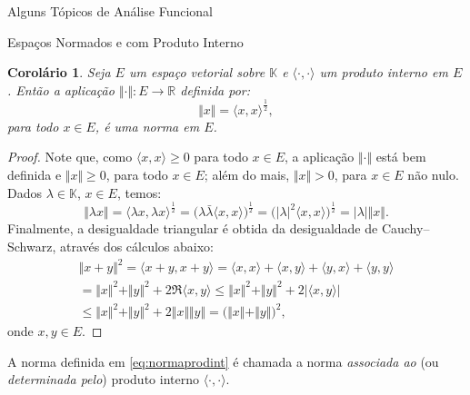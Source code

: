 \documentclass[oneside,final,11pt]{amsbook}
\newcommand{\R}{\mathds R}
\newcommand{\K}{\mathds K}
\theoremstyle{remark}\newtheorem{exercise}{Exercício}[chapter]
\theoremstyle{remark}\newtheorem{*exercise}[exercise]{\hbox to 0pt{\hskip 0pt minus 1fil*}Exercício}
\theoremstyle{definition}\newtheorem{exdefin}{Definição}[chapter]
\theoremstyle{plain}\newtheorem{teo}{Teorema}[section]
\theoremstyle{plain}\newtheorem{lem}[teo]{Lema}
\theoremstyle{plain}\newtheorem{prop}[teo]{Proposição}
\theoremstyle{plain}\newtheorem{cor}[teo]{Corolário}
\theoremstyle{definition}\newtheorem{defin}[teo]{Definição}
\theoremstyle{remark}\newtheorem{rem}[teo]{Observação}
\theoremstyle{definition}\newtheorem{notation}[teo]{Notação}
\theoremstyle{definition}\newtheorem{convention}[teo]{Convenção}
\theoremstyle{definition}\newtheorem{example}[teo]{Exemplo}
\numberwithin{section}{chapter}
\numberwithin{equation}{section}
\begin{document}
\begin{chapter}{Alguns Tópicos de Análise Funcional}
\begin{section}{Espaços Normados e com Produto Interno}
\begin{cor}
Seja $E$ um espaço vetorial sobre $\K$ e $\langle\cdot,\cdot\rangle$ um produto interno em $E$. Então a aplicação
$\Vert\cdot\Vert:E\to\R$ definida por:
\begin{equation}\label{eq:normaprodint}
\Vert x\Vert=\langle x,x\rangle^{\frac12},
\end{equation}
para todo $x\in E$, é uma norma em $E$.
\end{cor}
\begin{proof}
Note que, como $\langle x,x\rangle\ge0$ para todo $x\in E$, a aplicação $\Vert\cdot\Vert$ está bem definida
e $\Vert x\Vert\ge0$, para todo $x\in E$; além do mais, $\Vert x\Vert>0$, para $x\in E$ não nulo. Dados $\lambda\in\K$,
$x\in E$, temos:
\[\Vert\lambda x\Vert=\langle\lambda x,\lambda x\rangle^{\frac12}=\big(\lambda\bar\lambda\langle x,x\rangle\big)^{\frac12}
=\big(\vert\lambda\vert^2\langle x,x\rangle\big)^{\frac12}=\vert\lambda\vert\Vert x\Vert.\]
Finalmente, a desigualdade triangular é obtida da desigualdade de Cauchy--Schwarz, através dos cálculos abaixo:
\begin{multline*}
\Vert x+y\Vert^2=\langle x+y,x+y\rangle=\langle x,x\rangle+\langle x,y\rangle+\langle y,x\rangle+\langle y,y\rangle\\
=\Vert x\Vert^2+\Vert y\Vert^2+2\Re\langle x,y\rangle\le\Vert x\Vert^2+\Vert y\Vert^2+2\big\vert\langle x,y\rangle\big\vert\\
\le\Vert x\Vert^2+\Vert y\Vert^2+2\Vert x\Vert\Vert y\Vert=\big(\Vert x\Vert+\Vert y\Vert\big)^2,
\end{multline*}
onde $x,y\in E$.
\end{proof}
A norma definida em \eqref{eq:normaprodint} é chamada a norma {\em associada ao\/} (ou {\em determinada pelo})
produto interno $\langle\cdot,\cdot\rangle$.


\end{section}
\end{chapter}
\end{document}
